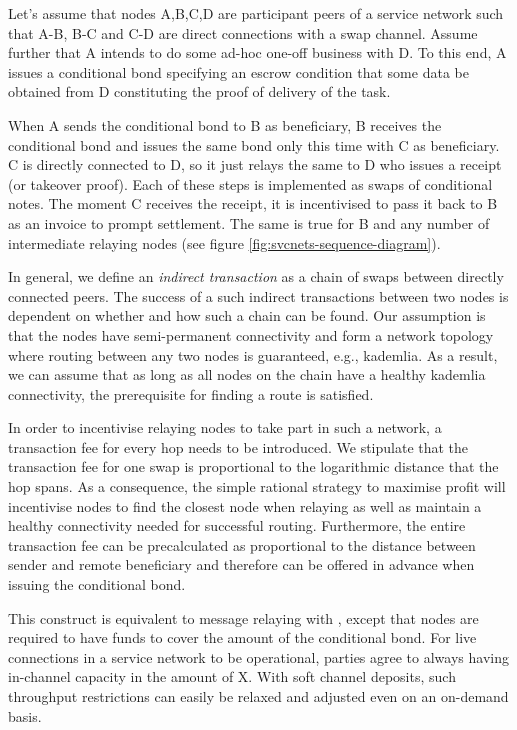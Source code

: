 Let's assume that nodes A,B,C,D are participant peers of a service network such that
A-B, B-C and C-D are direct connections with a swap channel.
Assume further that A intends to do some ad-hoc one-off business with D. To this end,  A issues a conditional bond specifying an escrow condition that some data be obtained from D constituting the proof of delivery of the task.

When A sends the conditional bond to B as beneficiary, B receives the conditional bond and issues the same bond only this time with C as beneficiary. C is directly connected to D, so it just relays the same to D who issues a receipt (or takeover proof). 
Each of these steps is implemented as swaps of conditional notes. The moment C receives the receipt, it is incentivised to pass it back to B as an invoice to prompt settlement. The same is true for B and any number of intermediate relaying nodes (see figure \ref{fig:svcnets-sequence-diagram}).




In general, we define an \emph{indirect transaction} as a chain of swaps between directly connected
peers. The success of a such indirect transactions between two nodes is dependent on whether and
how such a chain can be found. Our assumption is that the nodes have semi-permanent connectivity
and form a network topology where routing between any two nodes is guaranteed, e.g., kademlia. As a result, we can assume that as long as all nodes on the chain have a healthy kademlia connectivity, the prerequisite for finding a route is satisfied.

In order to incentivise relaying nodes to take part in such a network, a transaction fee for every hop needs to be introduced.  We stipulate that the transaction fee for one swap is proportional to the logarithmic distance that the hop spans. As a consequence, the simple rational strategy to maximise profit will incentivise nodes to find the closest node when relaying as well as maintain a healthy connectivity needed for successful routing. Furthermore, the entire transaction fee can be precalculated as proportional to the distance between sender and remote beneficiary and therefore can be offered in advance when issuing the conditional bond.

This construct is equivalent to message relaying with , except that nodes are required to have funds to cover the amount of the conditional bond.
For live connections in a service network to be operational, parties agree to always having in-channel capacity in the amount of X. With soft channel deposits, such throughput restrictions can easily be relaxed and adjusted even on an on-demand basis.

